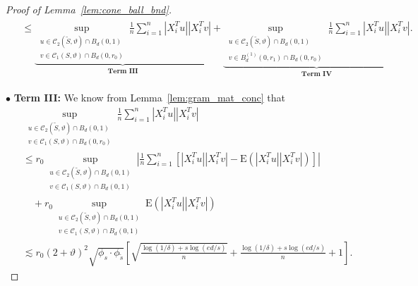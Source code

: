 \documentclass[ejsv2,noshowframe]{imsart}
\theoremstyle{plain}
\theoremstyle{definition}
\theoremstyle{remark}
\renewcommand{\tilde}{\widetilde}
\begin{document}
\begin{proof}[Proof of Lemma~\ref{lem:cone_ball_bnd}]
\begin{align}
\begin{split}
			&\leq \underbrace{\sup_{\substack{u \in \mathcal{C}_2(\tilde{S},\vartheta) \cap B_d(0,1)\\v\in \mathcal{C}_1(S,\vartheta) \cap B_d(0,r_0)}} \frac{1}{n} \sum_{i=1}^n \left|X_i^Tu\right| \left|X_i^Tv\right|}_{\textbf{Term III}} + \underbrace{\sup_{\substack{u \in \mathcal{C}_2(\tilde{S},\vartheta) \cap B_d(0,1)\\v\in B_d^{(1)}(0,r_1) \cap B_d(0,r_0)}} \frac{1}{n} \sum_{i=1}^n \left|X_i^Tu\right| \left|X_i^Tv\right|}_{\textbf{Term IV}}.
		\end{split}
	\end{align}
	
	$\bullet$ {\bf Term III:} We know from Lemma~\ref{lem:gram_mat_conc} that 
	\begin{align*}
		&\sup_{\substack{u \in \mathcal{C}_2(\tilde{S},\vartheta) \cap B_d(0,1)\\v\in \mathcal{C}_1(S,\vartheta) \cap B_d(0,r_0)}} \frac{1}{n} \sum_{i=1}^n \left|X_i^Tu\right| \left|X_i^Tv\right| \\
		&\leq r_0 \sup_{\substack{u \in \mathcal{C}_2(\tilde{S},\vartheta) \cap B_d(0,1)\\v\in \mathcal{C}_1(S,\vartheta) \cap B_d(0,1)}} \left|\frac{1}{n} \sum_{i=1}^n \left[\left|X_i^Tu\right| \left|X_i^Tv\right| - \mathrm{E}\left(|X_i^Tu| |X_i^Tv|\right)\right]\right| \\
		&\quad + r_0 \sup_{\substack{u \in \mathcal{C}_2(\tilde{S},\vartheta) \cap B_d(0,1)\\v\in \mathcal{C}_1(S,\vartheta) \cap B_d(0,1)}} \mathrm{E}\left(|X_i^Tu| |X_i^Tv|\right)\\
		&\lesssim r_0 (2+\vartheta)^2 \sqrt{\phi_s \cdot \phi_{\tilde{s}}} \left[\sqrt{\frac{\log(1/\delta) + s\log(ed/s)}{n}} + \frac{\log(1/\delta)  + s\log(ed/s)}{n} + 1 \right].
	\end{align*}
	

\end{proof}
\end{document}
